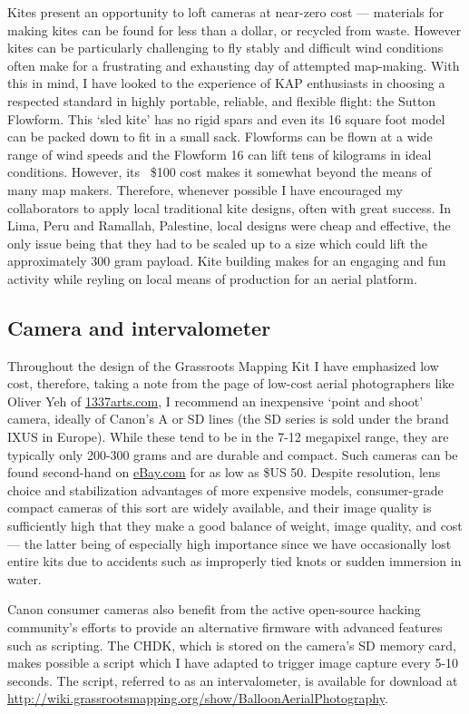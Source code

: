 \documentclass[11pt,oneside,notitlepage]{report}
\begin{document}
Kites present an opportunity to loft cameras at near-zero cost --- materials for making kites can be found for less than a dollar, or recycled from waste. However kites can be particularly challenging to fly stably and difficult wind conditions often make for a frustrating and exhausting day of attempted map-making. With this in mind, I have looked to the experience of \ac{KAP} enthusiasts in choosing a respected standard in highly portable, reliable, and flexible flight: the Sutton Flowform. This `sled kite' has no rigid spars and even its 16 square foot model can be packed down to fit in a small sack. Flowforms can be flown at a wide range of wind speeds and the Flowform 16 can lift tens of kilograms in ideal conditions. However, its ~\$100 cost makes it somewhat beyond the means of many map makers. Therefore, whenever possible I have encouraged my collaborators to apply local traditional kite designs, often with great success. In Lima, Peru and Ramallah, Palestine, local designs were cheap and effective, the only issue being that they had to be scaled up to a size which could lift the approximately 300 gram payload. Kite building makes for an engaging and fun activity while reyling on local means of production for an aerial platform. 

\subsection{Camera and intervalometer}

Throughout the design of the Grassroots Mapping Kit I have emphasized low cost, therefore, taking a note from the page of low-cost aerial photographers like Oliver Yeh of \href{http://1337arts.com}{1337arts.com}, I recommend an inexpensive `point and shoot' camera, ideally of Canon's A or SD lines (the SD series is sold under the brand IXUS in Europe). While these tend to be in the 7-12 megapixel range, they are typically only 200-300 grams and are durable and compact. Such cameras can be found second-hand on \href{http://ebay.com}{eBay.com} for as low as \$US 50. Despite resolution, lens choice and stabilization advantages of more expensive models, consumer-grade compact cameras of this sort are widely available, and their image quality is sufficiently high that they make a good balance of weight, image quality, and cost --- the latter being of especially high importance since we have occasionally lost entire kits due to accidents such as improperly tied knots or sudden immersion in water. 

Canon consumer cameras also benefit from the active open-source hacking community's efforts to provide an alternative firmware with advanced features such as scripting. The \ac{CHDK}, which is stored on the camera's SD memory card, makes possible a script which I have adapted to trigger image capture every 5-10 seconds. The script, referred to as an intervalometer, is available for download at \url{http://wiki.grassrootsmapping.org/show/BalloonAerialPhotography}.  
\end{document}

